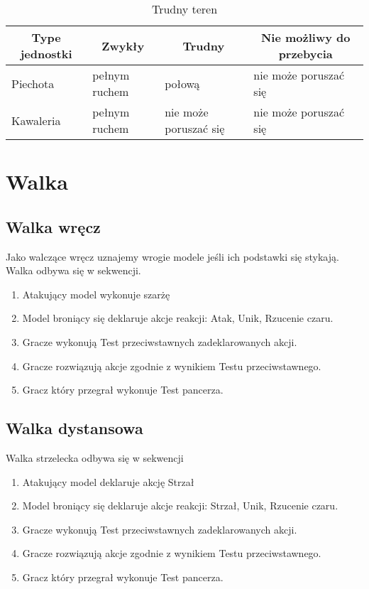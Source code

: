 \begin{table}[h]
\caption{Trudny teren}
\begin{tabular}{|l|l|l|l|}
\hline
\multicolumn{1}{c}{Type jednostki} & \multicolumn{1}{c}{Zwykły} & \multicolumn{1}{c}{Trudny} & \multicolumn{1}{c}{Nie możliwy do przebycia} \\ \hline
Piechota & pełnym ruchem & połową & nie może poruszać się \\ \hline
Kawaleria & pełnym ruchem & nie może poruszać się & nie może poruszać się \\ \hline
\end{tabular}

\end{table}


\section{Walka}
\subsection{Walka wręcz}
Jako walczące wręcz uznajemy wrogie modele jeśli ich podstawki się stykają. Walka odbywa się w sekwencji.
\begin{enumerate}
    \item Atakujący model wykonuje szarżę
    \item Model broniący się deklaruje akcje reakcji: Atak, Unik, Rzucenie czaru. 
    \item Gracze wykonują Test przeciwstawnych zadeklarowanych akcji.
    \item Gracze rozwiązują akcje zgodnie z wynikiem Testu przeciwstawnego.
    \item Gracz który przegrał wykonuje Test pancerza.
\end{enumerate}
\subsection{Walka dystansowa}
Walka strzelecka odbywa się w sekwencji
\begin{enumerate}
    \item Atakujący model deklaruje akcję Strzał
    \item Model broniący się deklaruje akcje reakcji: Strzał, Unik, Rzucenie czaru. 
    \item Gracze wykonują Test przeciwstawnych zadeklarowanych akcji.
    \item Gracze rozwiązują akcje zgodnie z wynikiem Testu przeciwstawnego. 
    \item Gracz który przegrał wykonuje Test pancerza.
\end{enumerate}

